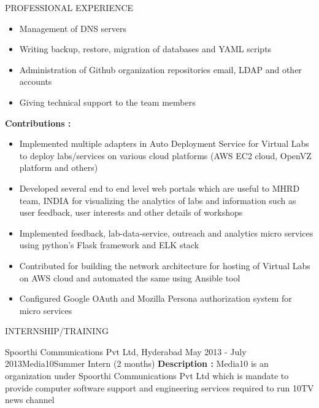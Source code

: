 \documentclass{resume} %
\begin{document}
\begin{rSection}{PROFESSIONAL EXPERIENCE}
\begin{rSubsection}
\begin{itemize}
    \item Management of DNS servers

    \item Writing backup, restore, migration of databases
      and YAML scripts

    \item Administration of Github organization repositories
      email, LDAP and other accounts

    \item Giving technical support to the team members
    \end{itemize}

    \hfill

    \textbf{Contributions : }
    \begin{itemize}

    \item Implemented multiple adapters in Auto Deployment
      Service for Virtual Labs to deploy labs/services on
      various cloud platforms (AWS EC2 cloud, OpenVZ platform and
      others)
      
    \item Developed several end to end level web portals which are
      useful to MHRD team, INDIA for visualizing the analytics of labs
      and information such as user feedback, user interests and other
      details of workshops
      
    \item Implemented feedback, lab-data-service, outreach and
      analytics micro services using python's Flask framework and ELK
      stack
      
    \item Contributed for building the network architecture for
      hosting of Virtual Labs on AWS cloud and automated the same
      using Ansible tool

    \item Configured Google OAuth and Mozilla Persona
      authorization system for micro services
    \end{itemize}
 
  \end{rSubsection}

\end{rSection}


\begin{rSection}{INTERNSHIP/TRAINING}
  \begin{rSubsection}
  {Spoorthi Communications Pvt Ltd, Hyderabad} {May 2013 - July
    2013}{Media10}{Summer Intern (2 months)} \textbf{Description :}
  Media10 is an organization under Spoorthi Communications Pvt Ltd
  which is mandate to provide computer software support and
  engineering services required to run 10TV news channel
  \end{rSubsection} 

\end{rSection} 
\end{document}
